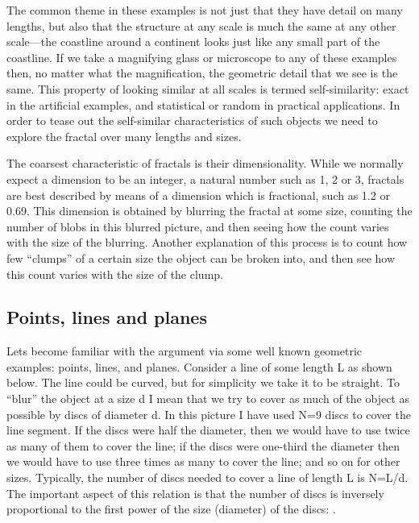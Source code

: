 \documentclass[12pt,a5paper]{article}
\begin{document}
The common theme in these examples is not just that they have detail 
on many lengths, but also that the structure at any scale is much the 
same at any other scale---the coastline around a continent looks just 
like any small part of the coastline.  If we take a magnifying glass 
or microscope to any of these examples then, no matter what the 
magnification, the geometric detail that we see is the same.  This 
property of looking similar at all scales is termed self-similarity: 
exact in the artificial examples, and statistical or random in 
practical applications.  In order to tease out the self-similar 
characteristics of such objects we need to explore the fractal over 
many lengths and sizes.  

The coarsest characteristic of fractals is their dimensionality.  
While we normally expect a dimension to be an integer, a natural 
number such as 1, 2 or 3, fractals are best described by means of a 
dimension which is fractional, such as 1.2 or 0.69.  This dimension 
is obtained by blurring the fractal at some size, counting the number 
of blobs in this blurred picture, and then seeing how the count 
varies with the size of the blurring.  Another explanation of this 
process is to count how few ``clumps'' of a certain size the object can 
be broken into, and then see how this count varies with the size of 
the clump.  

\subsection{Points, lines and planes}

Lets become familiar with the argument via some well known geometric 
examples: points, lines, and planes.  Consider a line of some length 
L as shown below.  The line
could be curved, but for simplicity we take it to be straight.  To 
``blur'' the object at a size d I mean that we try to cover as much of 
the object as possible by discs of diameter d.  In this picture I 
have used N=9 discs to cover the line segment.  If the discs were 
half the diameter, then we would have to use twice as many of them to 
cover the line;  if the discs were one-third the diameter then we 
would have to use three times as many to cover the line;  and so on 
for other sizes.  Typically, the number of discs needed to cover a 
line of length L is N=L/d.  The important aspect of this relation is 
that the number of discs is inversely proportional to the first power 
of the size (diameter) of the discs: .  
\end{document}
